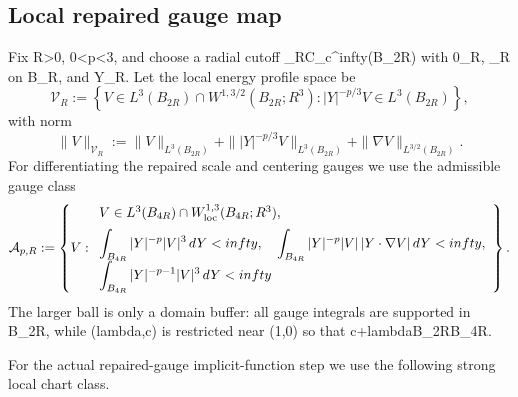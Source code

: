 \documentclass[11pt]{amsart}
\def\({}%
\def\){}%
\def\mathbb#1{#1}%
\def\lambda{lambda}%
\def\infty{infty}%
\theoremstyle{plain}
\theoremstyle{definition}
\theoremstyle{remark}
\newcommand{\RR}{\mathbb R}
\newcommand{\nn}{\nabla}
\begin{document}
\subsection{Local repaired gauge map}\label{paper2:sec:gauge-map}

Fix \(R>0\), \(0<p<3\), and choose a radial cutoff
\(\chi_R\in C_c^\infty(B_{2R})\) with \(0\le\chi_R\),
\(\chi_R\) on \(B_R\), and \(Y\cdot\nabla\chi_R\). Let the local
energy profile space be
\[
\mathcal V_R:=\left\{V\in L^3(B_{2R})\cap W^{1,3/2}(B_{2R};\RR^3):
|Y|^{-p/3}V\in L^3(B_{2R})\right\},
\]
with norm
\[
\|V\|_{\mathcal V_R}:=\|V\|_{L^3(B_{2R})}
+\||Y|^{-p/3}V\|_{L^3(B_{2R})}
+\|\nn V\|_{L^{3/2}(B_{2R})}.
\]
For differentiating the repaired scale and centering gauges we use the
admissible gauge class
\[
\mathcal A_{p,R}:=\left\{V:
\begin{array}{l}
V\in L^3(B_{4R})\cap W^{1,3}_{\rm loc}(B_{4R};\RR^3),\\[2mm]
\displaystyle \int_{B_{4R}}|Y|^{-p}|V|^3\,dY<\infty,\quad
\displaystyle \int_{B_{4R}}|Y|^{-p}|V|\,|Y\cdot\nabla V|\,dY<\infty,\\[2mm]
\displaystyle \int_{B_{4R}}|Y|^{-p-1}|V|^3\,dY<\infty
\end{array}\right\}.
\]
The larger ball is only a domain buffer: all gauge integrals are supported in
\(B_{2R}\), while \((\lambda,c)\) is restricted near \((1,0)\) so that
\(c+\lambda B_{2R}\subset B_{4R}\).

For the actual repaired-gauge implicit-function step we use the following
strong local chart class.
\end{document}
